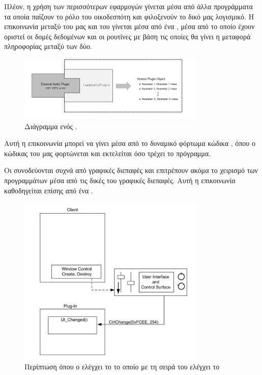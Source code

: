\documentclass[12pt]{extarticle}
\begin{document}
Πλέον, η χρήση των περισσότερων εφαρμογών  γίνεται μέσα 
από άλλα προγράμματα τα οποία παίζουν το ρόλο του οικοδεσπότη 
και φιλοξενούν το δικό μας λογισμικό. Η επικοινωνία μεταξύ 
του  μας και του  γίνεται μέσα από 
ένα , μέσα από το οποίο έχουν οριστεί οι δομές δεδομένων 
και οι ρουτίνες με βάση τις οποίες θα γίνει η μεταφορά πληροφορίας 
μεταξύ των δύο. 

\begin{figure}[htpb]
    \centering
    \includegraphics[width=0.8\textwidth]{./assets/audio_plugin_host.png}
    \caption{Διάγραμμα ενός .}
    \label{fig:}
\end{figure}

Αυτή η επικοινωνία μπορεί να γίνει μέσα από το δυναμικό 
φόρτωμα κώδικα \cite{DynamicLoadWiki}, όπου 
ο κώδικας του  μας φορτώνεται και εκτελείται όσο τρέχει
το  πρόγραμμα. \cite{DesignPlugins}

Οι  συνοδεύονται συχνά από γραφικές διεπαφές και επιτρέπουν ακόμα 
το χειρισμό των  προγραμμάτων μέσα από τις δικές του γραφικές 
διεπαφές. Αυτή η επικοινωνία καθοδηγείται επίσης από ένα . 

\begin{figure}[!htb]
    \centering
    \includegraphics[width=0.8\textwidth]{./assets/plugin_client.png}
    \caption{Περίπτωση όπου ο  ελέγχει το  το οποίο με τη σειρά του ελέγχει το }
    \label{fig:}
\end{figure}
\end{document}
